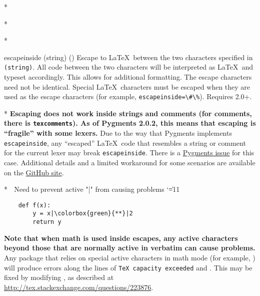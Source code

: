 \begin{paracol}{2}


\begin{optionlist}


\switchcolumn[0]*%

    
\switchcolumn

\switchcolumn[0]*%
  

\switchcolumn[0]*%
  \item[escapeinside (string) (\meta{none})]
  Escape to \LaTeX\ between the two characters specified in \texttt{\string(string\string)}.  All code between the two characters will be interpreted as \LaTeX\ and typeset accordingly.  This allows for additional formatting.  The escape characters need not be identical.  Special \LaTeX\ characters must be escaped when they are used as the escape characters (for example, \texttt{escapeinside=\textbackslash\#\textbackslash\%}).  Requires  2.0+.
  \switchcolumn

  \switchcolumn[0]*%
\textbf{Escaping does not work inside strings and comments (for comments, there is \texttt{texcomments}).  As of Pygments 2.0.2, this means that escaping is ``fragile'' with some lexers.}  Due to the way that Pygments implements \texttt{escapeinside}, any ``escaped'' \LaTeX\ code that resembles a string or comment for the current lexer may break \texttt{escapeinside}.  There is a \href{https://bitbucket.org/birkenfeld/pygments-main/issue/1118}{Pygments issue} for this case.  Additional details and a limited workaround for some scenarios are available on the \href{https://github.com/gpoore/minted/issues/70#issuecomment-111729930}{ GitHub site}.
\switchcolumn

\switchcolumn[0]*%
\begingroup  ^^A Need to prevent active "|" from causing problems
\catcode`\|=11
\begin{example}
    \begin{verbatim}
    def f(x):
        y = x|\colorbox{green}{**}|2
        return y
    \end{verbatim}
\end{example}
\endgroup

\textbf{Note that when math is used inside escapes, any active characters beyond those that are normally active in verbatim can cause problems.}  Any package that relies on special active characters in math mode (for example, ) will produce errors along the lines of \texttt{TeX capacity exceeded} and \texttt{\string\leavevmode \string\kern \string\z@}.  This may be fixed by modifying \texttt{\string\@noligs}, as described at \url{http://tex.stackexchange.com/questions/223876}.
\switchcolumn


\end{optionlist}
\end{paracol}
